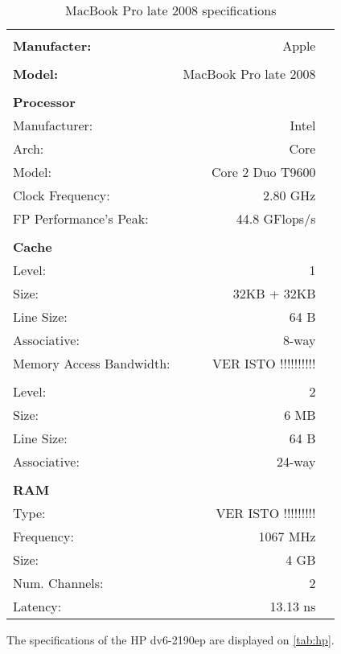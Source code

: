 \documentclass[a4paper,10pt,openright,openbib]{article}
\begin{document}
\begin{table}[!htp]
		\begin{tabular}{lrl}
			\hline \\
			\textbf{Manufacter:} & Apple \\
			\hline \\
			\textbf{Model:} & MacBook Pro late 2008 \\
			\hline \\
			\textbf{Processor} & & \\
			Manufacturer: & Intel & \\
			Arch: & Core & \\
			Model: & Core 2 Duo T9600 & \\
			Clock Frequency: & 2.80 GHz & \\
			FP Performance's Peak: & 44.8 GFlops/s & \\
			\hline \\
			\textbf{Cache} & & \\
			Level: & 1 & \\
			Size: & 32KB + 32KB & \\
			Line Size: & 64 B & \\
			Associative: & 8-way & \\
			Memory Access Bandwidth: & VER ISTO !!!!!!!!!! & \\
			\\
			Level: & 2 & \\
			Size: & 6 MB & \\
			Line Size: & 64 B & \\
			Associative: & 24-way & \\
			\hline \\
			\textbf{RAM} \\
			Type: & VER ISTO !!!!!!!!! & \\
			Frequency: & 1067 MHz & \\
			Size: & 4 GB & \\
			Num. Channels: & 2 & \\
			Latency: & 13.13 ns & \\
		\end{tabular}
		\caption{MacBook Pro late 2008 specifications}
		\label{tab:mbp}
\end{table}
The specifications of the HP dv6-2190ep are displayed on \autoref{tab:hp}. \\
\end{document}
